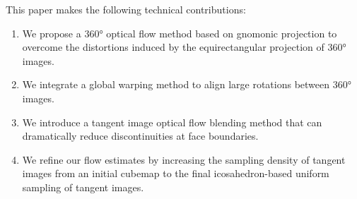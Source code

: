 This paper makes the following technical contributions:
%
\begin{enumerate}[nosep]
\item 
We propose a 360° optical flow method based on gnomonic projection to overcome the distortions induced by the  equirectangular projection of 360° images.

\item
We integrate a global warping method to align large rotations between 360° images.

\item
We introduce a tangent image optical flow blending method that can dramatically reduce discontinuities at face boundaries.

\item 
We refine our flow estimates by increasing the sampling density of tangent images from an initial cubemap to the final icosahedron-based uniform sampling of tangent images.
\end{enumerate}
